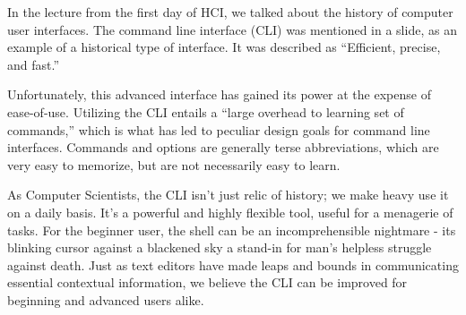 In the lecture from the first day of HCI, we talked about the history of
computer user interfaces. The command line interface (CLI) was mentioned in a
slide, as an example of a historical type of interface. It was described as
“Efficient, precise, and fast.”

Unfortunately, this advanced interface has gained its power at the expense of
ease-of-use. Utilizing the CLI entails a “large overhead to learning set of
commands,” which is what has led to peculiar design goals for command line
interfaces. Commands and options are generally terse abbreviations, which are
very easy to memorize, but are not necessarily easy to learn.

As Computer Scientists, the CLI isn’t just relic of history; we make heavy use
it on a daily basis. It’s a powerful and highly flexible tool, useful for a
menagerie of tasks. For the beginner user, the shell can be an incomprehensible
nightmare - its blinking cursor against a blackened sky a stand-in for man’s
helpless struggle against death. Just as text editors have made leaps and bounds
in communicating essential contextual information, we believe the CLI can be
improved for beginning and advanced users alike.

